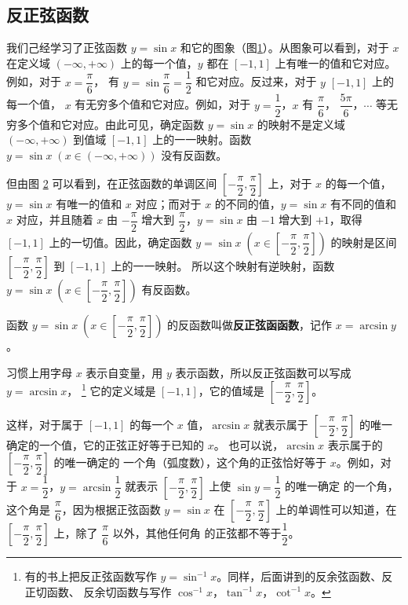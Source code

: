 \subsection{反正弦函数}\label{subsec:1-1}

我们己经学习了正弦函数 $y = \sin x$ 和它的图象（图\ref{fig:1-1}）。从图象可以看到，对于 $x$ 在定义域
$(-\infty, +\infty)$ 上的每一个值，$y$ 都在 $[-1, 1]$ 上有唯一的值和它对应。例如，对于 $x = \dfrac{\pi}{6}$，
有 $y = \sin\dfrac{\pi}{6} = \dfrac{1}{2}$ 和它对应。反过来，对于 $y$ $[-1, 1]$ 上的每一个值，
$x$ 有无穷多个值和它对应。例如，对于 $y = \dfrac{1}{2}$，$x$ 有 $\dfrac{\pi}{6}$，
$\dfrac{5\pi}{6}$，$\cdots$ 等无穷多个值和它对应。由此可见，确定函数 $y = \sin x$ 的映射不是定义域 $(-\infty, +\infty)$
到值域 $[-1, 1]$ 上的一一映射。函数 $y = \sin x \; (x \in (-\infty, +\infty))$ 没有反函数。

\begin{figure}[htbp]
    \centering
    
    \caption{}\label{fig:1-1}
\end{figure}

但由图 \ref{fig:1-2} 可以看到，在正弦函数的单调区间 $\left[ -\dfrac{\pi}{2}, \dfrac{\pi}{2} \right]$
上，对于 $x$ 的每一个值，$y = \sin x$ 有唯一的值和 $x$ 对应；而对于 $x$ 的不同的值，$y = \sin x$
有不同的值和 $x$ 对应，并且随着 $x$ 由 $-\dfrac{\pi}{2}$ 增大到 $\dfrac{\pi}{2}$，$y = \sin x$
由 $-1$ 增大到 $+1$，取得 $[-1, 1]$ 上的一切值。因此，确定函数
$y = \sin x \; \left( x \in \left[ -\dfrac{\pi}{2}, \dfrac{\pi}{2} \right]\right)$
的映射是区间 $\left[ -\dfrac{\pi}{2}, \dfrac{\pi}{2} \right]$ 到 $[-1, 1]$ 上的一一映射。
所以这个映射有逆映射，函数
$y = \sin x \; \left( x \in \left[ -\dfrac{\pi}{2}, \dfrac{\pi}{2} \right]\right)$
有反函数。

\begin{figure}[htbp]
    \centering
    
    \caption{}\label{fig:1-2}
\end{figure}

函数
$y = \sin x \; \left( x \in \left[ -\dfrac{\pi}{2}, \dfrac{\pi}{2} \right]\right)$
的反函数叫做\textbf{反正弦函函数}，记作 $x = \arcsin y$。

\newpage
习惯上用字母 $x$ 表示自变量，用 $y$ 表示函数，所以反正弦函数可以写成 $y = \arcsin x$，
\footnote{有的书上把反正弦函数写作 $y = \sin^{-1}x$。同样，后面讲到的反余弦函数、反正切函数、
反余切函数与写作 $\cos^{-1}x$，$\tan^{-1}x$，$\cot^{-1}x$。}
它的定义域是 $[-1, 1]$，它的值域是 $\left[ -\dfrac{\pi}{2}, \dfrac{\pi}{2} \right]$。

这样，对于属于 $[-1, 1]$ 的每一个 $x$ 值，$\arcsin x$ 就表示属于
$\left[ -\dfrac{\pi}{2}, \dfrac{\pi}{2} \right]$ 的唯一确定的一个值，它的正弦正好等于已知的 $x$。
也可以说，$\arcsin x$ 表示属于的 $\left[ -\dfrac{\pi}{2}, \dfrac{\pi}{2} \right]$ 的唯一确定的
一个角（弧度数），这个角的正弦恰好等于 $x$。例如，对于 $x = \dfrac{1}{2}$，$y = \arcsin \dfrac{1}{2}$
就表示 $\left[ -\dfrac{\pi}{2}, \dfrac{\pi}{2} \right]$ 上使 $\sin y = \dfrac{1}{2}$ 的唯一确定
的一个角，这个角是 $\dfrac{\pi}{6}$，因为根据正弦函数 $y = \sin x$ 在
$\left[ -\dfrac{\pi}{2}, \dfrac{\pi}{2} \right]$ 上的单调性可以知道，在
$\left[ -\dfrac{\pi}{2}, \dfrac{\pi}{2} \right]$ 上，除了 $\dfrac{\pi}{6}$ 以外，其他任何角
的正弦都不等于$\dfrac{1}{2}$。


